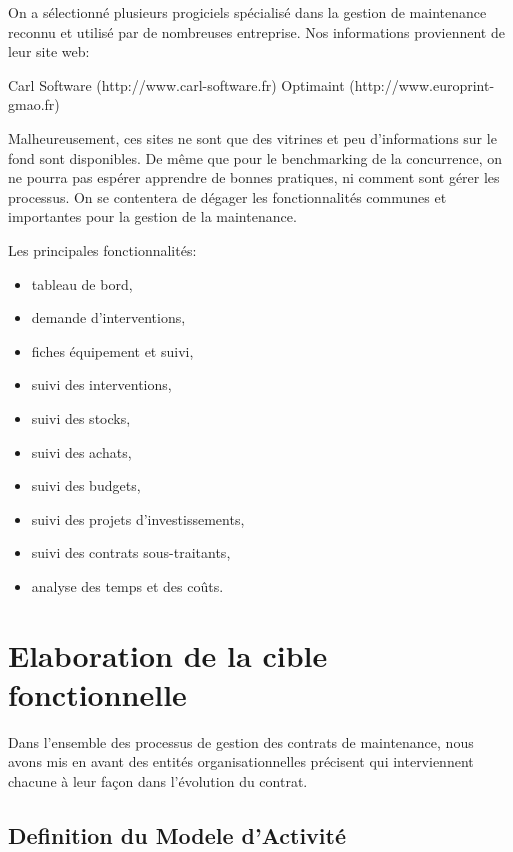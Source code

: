 On a sélectionné plusieurs progiciels spécialisé dans la gestion de maintenance reconnu et utilisé par de nombreuses entreprise. Nos informations proviennent de leur site web:

Carl Software (http://www.carl-software.fr)
Optimaint (http://www.europrint-gmao.fr)

Malheureusement, ces sites ne sont que des vitrines et peu d’informations sur le fond sont disponibles. De même que pour le benchmarking de la concurrence, on ne pourra pas espérer apprendre de bonnes pratiques, ni comment sont gérer les processus. On se contentera de dégager les fonctionnalités communes et importantes pour la gestion de la maintenance.

Les principales fonctionnalités:

\begin{itemize}
\item tableau de bord,
\item demande d’interventions,
\item fiches équipement et suivi,
\item suivi des interventions,
\item suivi des stocks,
\item suivi des achats,
\item suivi des budgets,
\item suivi des projets d’investissements,
\item suivi des contrats sous-traitants,
\item analyse des temps et des coûts.
\end{itemize}

\section{Elaboration de la cible fonctionnelle}
Dans l'ensemble des processus de gestion des contrats de maintenance, nous avons mis en avant des entités organisationnelles précisent qui interviennent chacune à leur façon dans l'évolution du contrat.

\subsection{Definition du Modele d'Activité} 

